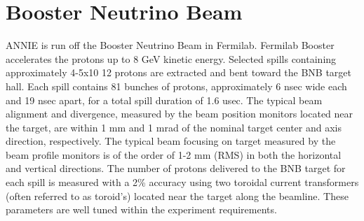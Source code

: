 
\chapter{Booster Neutrino Beam}
\label{app:B}


ANNIE is run off the Booster Neutrino Beam in Fermilab.
Fermilab Booster accelerates the protons up to 8 GeV kinetic energy.
Selected spills containing approximately 4-5x10 12 protons are extracted and %
bent toward the BNB target hall.
Each spill contains 81 bunches of protons, approximately 6 nsec wide each and 19 nsec apart, %
for a total spill duration of 1.6 usec.
The typical beam alignment and divergence, measured by the beam position %
monitors located near the target, are within 1 mm and 1 mrad of the nominal target center %
and axis direction, respectively.
The typical beam focusing on target measured by the beam profile monitors is of the order %
of 1-2 mm (RMS) in both the horizontal and vertical directions.
The number of protons delivered to the BNB target for each spill is measured with a %
2\% accuracy using two toroidal current transformers (often referred to as toroid’s) %
located near the target along the beamline.
These parameters are well tuned within the experiment requirements.


